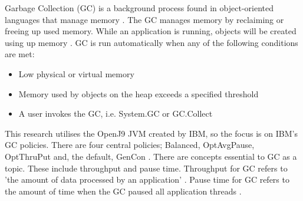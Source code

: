 Garbage Collection (GC) is a background process found in object-oriented languages that manage memory \cite{micrsoftGC}. The GC manages memory by reclaiming or freeing up used memory. While an application is running, objects will be created using up memory \cite{micrsoftGC}. GC is run
automatically when any of the following conditions are met:
\begin{itemize}
    \item Low physical or virtual memory
    \item Memory used by objects on the heap exceeds a specified threshold
    \item A user invokes the GC, i.e. System.GC or GC.Collect \cite{persson2006gc2,micrsoftGC}
\end{itemize}
This research utilises the OpenJ9 JVM created by IBM, so the
focus is on IBM's GC policies. There are four central policies;
Balanced, OptAvgPause, OptThruPut and, the default, GenCon \cite{persson2006gc1}.
\newline\newline
There are concepts essential to GC as a topic. These include
throughput and pause time. Throughput for GC refers to 'the amount of data processed by an application' \cite{persson2006gc2}. Pause time
for GC refers to the amount of time when the GC paused all application threads \cite{persson2006gc2}.
